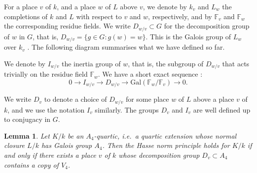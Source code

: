 \documentclass{amsart}
\numberwithin{equation}{section} \numberwithin{figure}{section}
\theoremstyle{one}
\newtheorem{lemma}[theorem]{\textbf{Lemma}}
\theoremstyle{definition}
\begin{document}
For a place $v$ of $k$, and a place $w$ of $L$ above $v$, we denote by $k_v$ and $L_w$ the completions of $k$ and $L$ with respect to $v$ and $w$, respectively, and by $\mathbb{F}_v$ and $\mathbb{F}_w$ the corresponding residue fields. We write $D_{w/v}\subset G$ for the decomposition group of $w$ in $G$, that is, $D_{w/v}=\{g\in G\colon g(w)=w\}$. This is the Galois group of $L_w$ over $k_v$ \cite[Prop. II.9.6]{neu:99}.  The following diagram summarises what we have defined so far.

\begin{center}
\end{center}

 We denote by $I_{w/v}$ the inertia group of $w$, that is, the subgroup of $D_{w/v}$ that acts trivially on the residue field $\mathbb{F}_w$. We have a short exact sequence \cite[Prop. II.9.9]{neu:99}: \begin{equation}\label{ses Dv Iv}
0\longrightarrow I_{w/v}\longrightarrow D_{w/v}\longrightarrow \mbox{Gal}(\mathbb{F}_w/\mathbb{F}_v)\longrightarrow 0.
\end{equation}



We write $D_v$ to denote a choice of $D_{w/v}$ for some place $w$ of $L$ above a place $v$ of $k$, and we use the notation $I_v$ similarly. The groups $D_v$ and $I_v$ are well defined up to conjugacy in $G$. 

\begin{lemma}\label{lem:MN}
Let $K/k$ be an $A_4$-quartic, 
i.e.\ a quartic extension whose normal closure $L/k$ has Galois group $A_4$. Then the Hasse norm principle holds for $K/k$ if and only if there exists a place $v$ of $k$ whose decomposition group $D_v\subset A_4$ contains a copy of $V_4$.     
\end{lemma}
\end{document}
